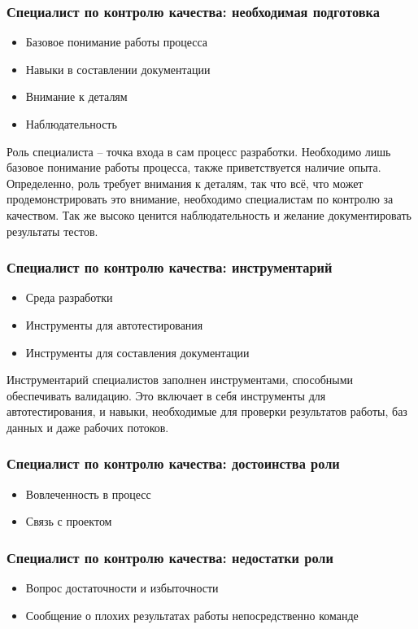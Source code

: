\documentclass{../industrial-development}
\begin{document}
\begin{frame} \frametitle{Специалист по контролю качества: необходимая подготовка}
  \begin{itemize}
	\item Базовое понимание работы процесса
	\item Навыки в составлении документации
	\item Внимание к деталям
	\item Наблюдательность 
	\end{itemize}
\end{frame}

\lecturenotes

Роль специалиста – точка входа в сам процесс разработки. Необходимо лишь базовое понимание работы процесса, также приветствуется наличие опыта. 
Определенно, роль требует внимания к деталям, так что всё, что может продемонстрировать это внимание, необходимо специалистам по контролю за качеством. Так же высоко ценится наблюдательность и желание документировать результаты тестов. ~\cite{Anatomy}

\begin{frame} \frametitle{Специалист по контролю качества: инструментарий}
  \begin{itemize}
	\item Среда разработки
	\item Инструменты для автотестирования
	\item Инструменты для составления документации
	\end{itemize}
\end{frame}

\lecturenotes

Инструментарий специалистов заполнен инструментами, способными обеспечивать валидацию. Это включает в себя инструменты для автотестирования, и навыки, необходимые для проверки результатов работы, баз данных и даже рабочих потоков.  ~\cite{Anatomy}

\begin{frame} \frametitle{Специалист по контролю качества: достоинства роли}
  \begin{itemize}
	\item Вовлеченность в процесс
	\item Связь с проектом
	\end{itemize}
\end{frame}

\begin{frame} \frametitle{Специалист по контролю качества: недостатки роли}
  \begin{itemize}
	\item Вопрос достаточности и избыточности
	\item Сообщение о плохих результатах работы непосредственно команде
	\end{itemize}
\end{frame}
\end{document}
